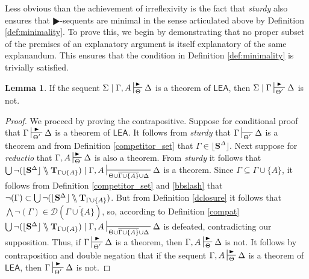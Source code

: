 \documentclass{article}
\theoremstyle{definition}
\theoremstyle{definition}
\theoremstyle{definition}
\newtheorem{lemma}{Lemma}
\theoremstyle{definition}
\theoremstyle{remark}
\theoremstyle{definition}
\theoremstyle{definition}
\begin{document}
\vspace{2mm}

Less obvious than the achievement of irreflexivity is the fact that \textit{sturdy} also ensures that $ \RHD$-sequents are minimal in the sense articulated above by Definition \ref{def:minimality}. To prove this, we begin by demonstrating that no proper subset of the premises of an explanatory argument is itself explanatory of the same explanandum. This ensures that the condition in Definition \ref{def:minimality} is trivially satisfied. 


\begin{lemma}\label{lem:psubset}
	If the sequent $ \Sigma\mid \Gamma, A \sststile{\Theta}{\RHD} \Delta $ is a theorem of $ \mathsf{LEA}$, then  $ \Sigma\mid \Gamma \sststile{\Theta'}{\RHD} \Delta $ is not.
	
	\begin{proof}
		We proceed by proving the contrapositive. Suppose for conditional proof that $ \Gamma\sststile{\Theta'}{\RHD} \Delta $ is a theorem of $ \mathsf{LEA}$. It follows from \textit{sturdy} that $ \Gamma\sststile{\Theta'}{} \Delta $ is a theorem and from Definition \ref{competitor_set} that $ \Gamma \in \lfloor \mathbf{S}^\Delta \rfloor$. Next suppose for \textit{reductio} that $ \Gamma, A \sststile{\Theta}{\RHD} \Delta $ is also a theorem. From \textit{sturdy} it follows that $\bigcup\neg(\lfloor \mathbf{S}^\Delta \rfloor\bbslash\mathbf{T}_{\Gamma\cup \{A\}})\mid\Gamma, A \sststile{\Theta\cup \overline{\Gamma\cup \{A\} }\cup\Delta}{}\Delta$ is a theorem. Since $ \Gamma \subseteq \Gamma\cup\{A\} $, it follows from Definition \ref{competitor_set} and \ref{bbslash} that $ \neg(\Gamma) \subset \bigcup\neg(\lfloor \mathbf{S}^\Delta \rfloor\bbslash\mathbf{T}_{\Gamma\cup \{A\}}) $. But from Definition \ref{dclosure} it follows that $ \bigwedge\neg(\Gamma) \in \mathcal{D}(\overline{\Gamma\cup\{A\}}) $, so, according to Definition \ref{compat} $\bigcup\neg(\lfloor \mathbf{S}^\Delta \rfloor\bbslash\mathbf{T}_{\Gamma\cup \{A\}})\mid\Gamma, A \sststile{\Theta\cup \overline{\Gamma\cup \{A\} }\cup\Delta}{}\Delta$ is defeated, contradicting our supposition. Thus, if  $ \Gamma\sststile{\Theta'}{\RHD} \Delta $ is a theorem, then $ \Gamma, A \sststile{\Theta}{\RHD} \Delta $ is not. It follows by contraposition and double negation that if the sequent $ \Gamma, A \sststile{\Theta}{\RHD} \Delta $ is a theorem of $ \mathsf{LEA}$, then  $ \Gamma \sststile{\Theta'}{\RHD} \Delta $ is not.
	\end{proof}
\end{lemma}
\end{document}

